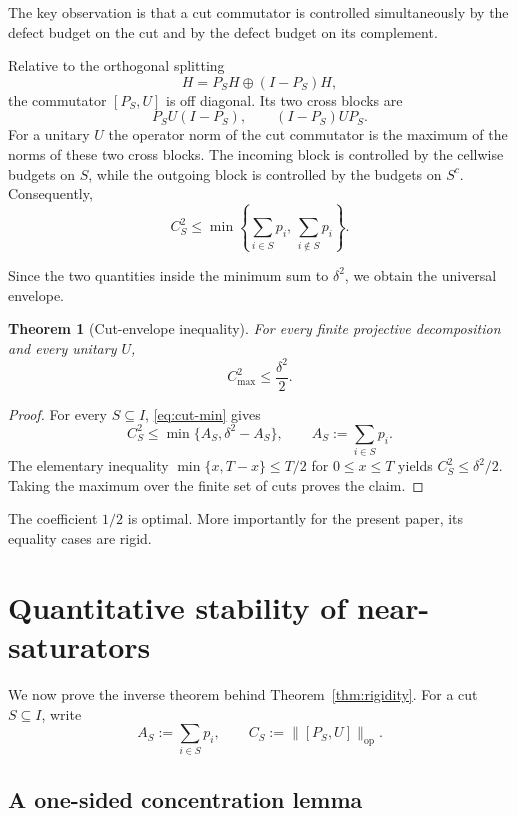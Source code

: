 \documentclass[11pt]{article}
\newtheorem{theorem}{Theorem}[section]
\newcommand{\op}{\mathrm{op}}
\newcommand{\cmax}{C_{\max}}
\newcommand{\dd}{\delta}
\begin{document}
The key observation is that a cut commutator is controlled simultaneously by
the defect budget on the cut and by the defect budget on its complement.

Relative to the orthogonal splitting
\[
  H=P_SH\oplus (I-P_S)H,
\]
the commutator $[P_S,U]$ is off diagonal.  Its two cross blocks are
\[
  P_SU(I-P_S),
  \qquad
  (I-P_S)UP_S.
\]
For a unitary $U$ the operator norm of the cut commutator is the maximum of
the norms of these two cross blocks.  The incoming block is controlled by the
cellwise budgets on $S$, while the outgoing block is controlled by the
budgets on $S^c$.  Consequently,
\begin{equation}\label{eq:cut-min}
  C_S^2
  \le
  \min\left\{
    \sum_{i\in S}p_i,\,
    \sum_{i\notin S}p_i
  \right\}.
\end{equation}

Since the two quantities inside the minimum sum to $\dd^2$, we obtain the
universal envelope.

\begin{theorem}[Cut-envelope inequality]\label{thm:envelope}
For every finite projective decomposition and every unitary $U$,
\[
  \boxed{\cmax^2\le\frac{\dd^2}{2}}.
\]
\end{theorem}

\begin{proof}
For every $S\subseteq I$, \eqref{eq:cut-min} gives
\[
  C_S^2
  \le
  \min\{A_S,\dd^2-A_S\},
  \qquad
  A_S:=\sum_{i\in S}p_i.
\]
The elementary inequality
$\min\{x,T-x\}\le T/2$ for $0\le x\le T$ yields
$C_S^2\le\dd^2/2$.  Taking the maximum over the finite set of cuts proves the
claim.
\end{proof}

The coefficient $1/2$ is optimal.  More importantly for the present paper,
its equality cases are rigid.

\section{Quantitative stability of near-saturators}

We now prove the inverse theorem behind Theorem~\ref{thm:rigidity}.  For a
cut $S\subseteq I$, write
\[
  A_S:=\sum_{i\in S}p_i,
  \qquad
  C_S:=\|[P_S,U]\|_{\op}.
\]

\subsection{A one-sided concentration lemma}
\end{document}
